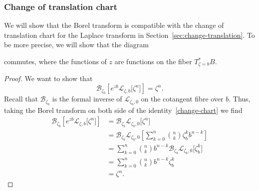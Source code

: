 \documentclass{article}
\newcommand{\C}{\mathbb{C}}
\newcommand{\laplace}{\mathcal{L}}
\newcommand{\borel}{\mathcal{B}}
\theoremstyle{definition}
\theoremstyle{plain}
\begin{document}
\subsubsection{Change of translation chart}\label{transl-borel}
We will show that the Borel transform is compatible with the change of translation chart for the Laplace transform in Section~\ref{sec:change-translation}. To be more precise, we will show that the diagram
\begin{center}
\end{center}
commutes, where the functions of $z$ are functions on the fiber $T^*_{\zeta=b}B$. 
\begin{proof}
We want to show that 
\[\borel_{\zeta_b}\left[e^{zb} \laplace_{\zeta,b}\big[\zeta^n\big]\right]=\zeta^n.\]
Recall that $\borel_{\zeta_b}$
is the formal inverse of $\laplace_{\zeta_b,0}$ on the cotangent fibre over $b$. Thus, taking the Borel transform on both side of the identity~\eqref{change-chart} we find
  \begin{align*}
      \borel_{\zeta_b}\left[e^{zb} \laplace_{\zeta,b}\big[\zeta^n\big]\right]&=\borel_{\zeta_b}\laplace_{\zeta_b,0}\big[\zeta^n\big]\\
      &=\borel_{\zeta_b}\laplace_{\zeta_b,0}\left[\sum_{k=0}^n{n\choose k}\zeta_b^k b^{n-k}\right]\\
      &=\sum_{k=0}^n{n\choose k} b^{n-k}\borel_{\zeta_b}\laplace_{\zeta_b,0}\big[\zeta_b^k \big]\\
      &=\sum_{k=0}^n{n\choose k} b^{n-k}\zeta_b^k\\
      &=\zeta^n.
  \end{align*}
\end{proof}
\end{document}
